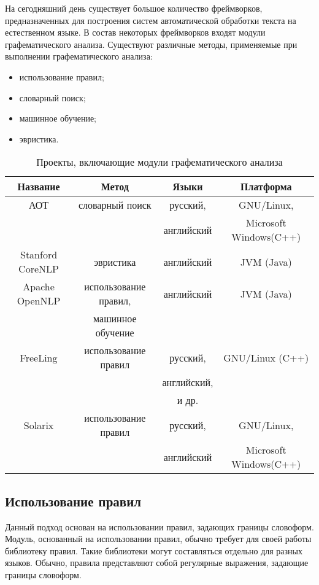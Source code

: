 На сегодняшний день существует большое количество фреймворков, предназначенных для построения систем автоматической обработки текста на естественном языке. В состав некоторых фреймворков входят модули графематического анализа. Существуют различные методы, применяемые при выполнении графематического анализа:

\begin{itemize}
\item
использование правил;
\item
словарный поиск;
\item
машинное обучение;
\item
эвристика.
\end{itemize}

\begin{table}[H] \small
	\centering
	\label{t:thyp_gd1}
	\begin{tabular}{ | c | c | c | c |}
		\hline
		Название 							& Метод 				& Языки 		& Платформа 				\\ \hline
		АОТ\cite{web.aot}					& словарный поиск		& русский,		& GNU/Linux,			\\
											&						& английский	& Microsoft Windows(C++)\\ \hline
		Stanford CoreNLP\cite{web.corenlp}	& эвристика				& английский	& JVM (Java)			\\ \hline
		Apache OpenNLP\cite{web.opennlp}	& использование правил,	& английский	& JVM (Java)			\\
											& машинное обучение		& 				&						\\ \hline
		FreeLing\cite{web.freeling}			& использование правил	& русский,		& GNU/Linux (C++)		\\
											&						& английский,	&						\\
											&						& и др.			&						\\ \hline
		Solarix\cite{web.solarix}			& использование правил	& русский,		& GNU/Linux,			\\ 
											&						& английский	& Microsoft Windows(C++)\\
		\hline
	\end{tabular}
	\caption{Проекты, включающие модули графематического анализа}
\end{table}

\subsection{Использование правил}
Данный подход основан на использовании правил, задающих границы словоформ. Модуль, основанный на использовании правил, обычно требует для своей работы библиотеку правил. Такие библиотеки могут составляться отдельно для разных языков. Обычно, правила представляют собой регулярные выражения, задающие границы словоформ.

